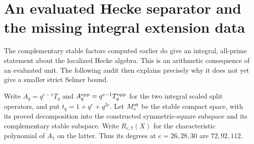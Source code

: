 \section{An evaluated Hecke separator and the missing integral extension data}
\label{sec:kt-hecke-normal}

The complementary stable factors computed earlier do give an
integral, all-prime statement about the localized Hecke algebra.
This is an arithmetic consequence of an evaluated unit.  The
following audit then explains precisely why it does not yet give
a smaller strict Selmer bound.

Write $A_q=q^{e-1}T_q$ and $A_q^{\rm opp}=q^{e-1}T_q^{\rm opp}$
for the two integral scaled split operators, and put
$t_q=1+q^e+q^{2e}$.  Let $M^{\rm st}_e$ be the stable compact
space, with its proved decomposition into the constructed
symmetric-square subspace and its complementary stable subspace.
Write $R_{e,7}(X)$ for the characteristic polynomial of $A_7$
on the latter.  Thus its degrees at $e=26,28,30$ are
$72,92,112$.

